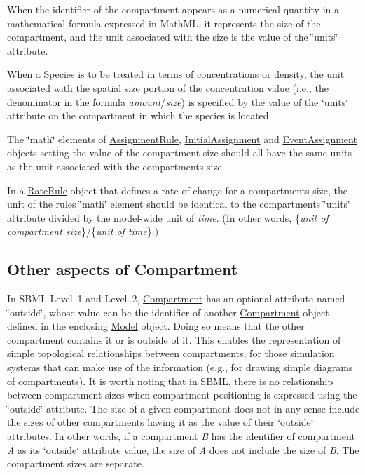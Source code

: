\begin{DoxyItemize}
\item When the identifier of the compartment appears as a numerical quantity in a mathematical formula expressed in Math\+ML, it represents the size of the compartment, and the unit associated with the size is the value of the \char`\"{}units\char`\"{} attribute.


\item When a \hyperlink{class_species}{Species} is to be treated in terms of concentrations or density, the unit associated with the spatial size portion of the concentration value (i.\+e., the denominator in the formula {\itshape amount}/{\itshape size}) is specified by the value of the \char`\"{}units\char`\"{} attribute on the compartment in which the species is located.


\item The \char`\"{}math\char`\"{} elements of \hyperlink{class_assignment_rule}{Assignment\+Rule}, \hyperlink{class_initial_assignment}{Initial\+Assignment} and \hyperlink{class_event_assignment}{Event\+Assignment} objects setting the value of the compartment size should all have the same units as the unit associated with the compartment\textquotesingle{}s size.


\item In a \hyperlink{class_rate_rule}{Rate\+Rule} object that defines a rate of change for a compartment\textquotesingle{}s size, the unit of the rule\textquotesingle{}s \char`\"{}math\char`\"{} element should be identical to the compartment\textquotesingle{}s \char`\"{}units\char`\"{} attribute divided by the model-\/wide unit of {\itshape time}. (In other words, \{{\itshape unit of compartment size}\}/\{{\itshape unit of time}\}.)


\end{DoxyItemize}\hypertarget{class_compartment_comp-other}{}\subsection{Other aspects of Compartment}\label{class_compartment_comp-other}
In S\+B\+ML Level~1 and Level~2, \hyperlink{class_compartment}{Compartment} has an optional attribute named \char`\"{}outside\char`\"{}, whose value can be the identifier of another \hyperlink{class_compartment}{Compartment} object defined in the enclosing \hyperlink{class_model}{Model} object. Doing so means that the other compartment contains it or is outside of it. This enables the representation of simple topological relationships between compartments, for those simulation systems that can make use of the information (e.\+g., for drawing simple diagrams of compartments). It is worth noting that in S\+B\+ML, there is no relationship between compartment sizes when compartment positioning is expressed using the \char`\"{}outside\char`\"{} attribute. The size of a given compartment does not in any sense include the sizes of other compartments having it as the value of their \char`\"{}outside\char`\"{} attributes. In other words, if a compartment {\itshape B} has the identifier of compartment {\itshape A} as its \char`\"{}outside\char`\"{} attribute value, the size of {\itshape A} does not include the size of {\itshape B}. The compartment sizes are separate.

